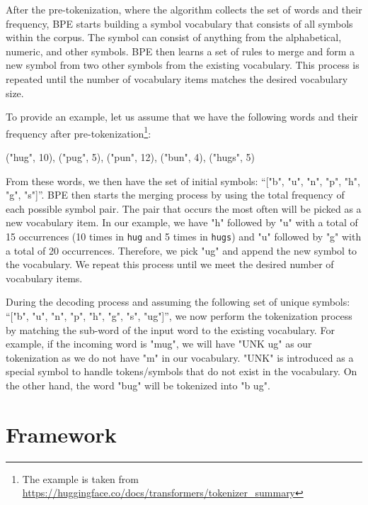 After the pre-tokenization, where the algorithm collects the set of words and their frequency, BPE starts building a symbol vocabulary that consists of all symbols within the corpus. The symbol can consist of anything from the alphabetical, numeric, and other symbols. BPE then learns a set of rules to merge and form a new symbol from two other symbols from the existing vocabulary. This process is repeated until the number of vocabulary items matches the desired vocabulary size.

To provide an example, let us assume that we have the following words and their frequency after pre-tokenization\footnote{The example is taken from \url{https://huggingface.co/docs/transformers/tokenizer_summary}}:

\bigskip
("hug", 10), ("pug", 5), ("pun", 12), ("bun", 4), ("hugs", 5)
\bigskip

From these words, we then have the set of initial symbols: ``["b", "u", "n", "p", "h", "g", "s"]''. BPE then starts the merging process by using the total frequency of each possible symbol pair. The pair that occurs the most often will be picked as a new vocabulary item. In our example, we have "h" followed by "u" with a total of 15 occurrences (10 times in \texttt{hug} and 5 times in \texttt{hugs}) and "u" followed by "g" with a total of 20 occurrences. Therefore, we pick "ug" and append the new symbol to the vocabulary. We repeat this process until we meet the desired number of vocabulary items.

During the decoding process and assuming the following set of unique symbols: ``["b", "u", "n", "p", "h", "g", "s", "ug"]'', we now perform the tokenization process by matching the sub-word of the input word to the existing vocabulary. For example, if the incoming word is "mug", we will have "UNK ug" as our tokenization as we do not have "m" in our vocabulary. "UNK" is introduced as a special symbol to handle tokens/symbols that do not exist in the vocabulary. On the other hand, the word "bug" will be tokenized into "b ug".

\section{Framework}
\label{sec:framework}
